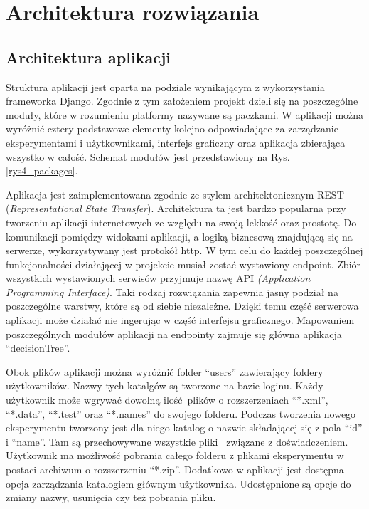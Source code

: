 \chapter{Architektura rozwiązania}
\section{Architektura aplikacji}
Struktura aplikacji jest oparta na podziale wynikającym z wykorzystania frameworka Django. Zgodnie z tym założeniem projekt dzieli się na poszczególne moduły, które w rozumieniu platformy nazywane są paczkami.  W aplikacji można wyróżnić cztery podstawowe elementy kolejno odpowiadające za zarządzanie eksperymentami i użytkownikami, interfejs graficzny oraz aplikacja zbierająca wszystko w całość. Schemat modułów jest przedstawiony na Rys. \ref{rys4_packages}. 

Aplikacja jest zaimplementowana zgodnie ze stylem architektonicznym REST (\textit{Representational State Transfer}). Architektura ta jest bardzo popularna przy tworzeniu aplikacji internetowych ze względu na swoją lekkość oraz prostotę. Do komunikacji pomiędzy widokami aplikacji, a logiką biznesową znajdującą się na serwerze, wykorzystywany jest protokół http. W tym celu do każdej poszczególnej funkcjonalności działającej w projekcie musiał zostać wystawiony endpoint. Zbiór wszystkich wystawionych serwisów przyjmuje nazwę API \textit{(Application Programming Interface)}. Taki rodzaj rozwiązania zapewnia jasny podział na poszczególne warstwy, które są od siebie niezależne. Dzięki temu część serwerowa aplikacji może działać nie ingerując w część interfejsu graficznego. Mapowaniem poszczególnych modułów aplikacji na endpointy zajmuje się główna aplikacja \enquote{decisionTree}. 


Obok plików aplikacji można wyróżnić folder \enquote{users} zawierający foldery użytkowników. Nazwy tych katalgów są tworzone na bazie loginu. Każdy użytkownik może wgrywać dowolną ilość plików o rozszerzeniach \enquote{*.xml}, \enquote{*.data}, \enquote{*.test} oraz \enquote{*.names} do swojego folderu. Podczas tworzenia nowego eksperymentu tworzony jest dla niego katalog o nazwie składającej się z pola  \enquote{id} i \enquote{name}. Tam są przechowywane wszystkie pliki  związane z doświadczeniem. Użytkownik ma możliwość pobrania całego folderu z plikami eksperymentu w postaci archiwum o rozszerzeniu  \enquote{*.zip}. Dodatkowo w aplikacji jest dostępna opcja zarządzania katalogiem głównym użytkownika. Udostępnione są opcje do zmiany nazwy, usunięcia czy też pobrania pliku. 

